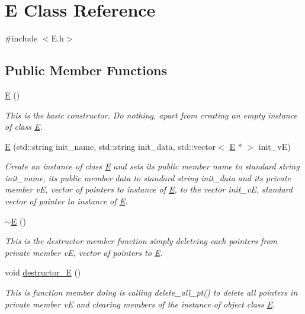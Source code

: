 \hypertarget{classE}{}\section{E Class Reference}
\label{classE}


{\ttfamily \#include $<$E.\+h$>$}

\subsection*{Public Member Functions}
\begin{DoxyCompactItemize}
\item 
\hyperlink{classE_ac26294d340a47c6a51c615c177052c91}{E} ()
\begin{DoxyCompactList}\small\item\em This is the basic constructor. Do nothing, apart from creating an empty instance of class \hyperlink{classE}{E}. \end{DoxyCompactList}\item 
\hyperlink{classE_aaef580a7f041f660ec68449300d516c8}{E} (std\+::string init\+\_\+name, std\+::string init\+\_\+data, std\+::vector$<$ \hyperlink{classE}{E} $\ast$ $>$ init\+\_\+vE)
\begin{DoxyCompactList}\small\item\em Create an instance of class \hyperlink{classE}{E} and sets its public member \textquotesingle{}name\textquotesingle{} to standard string init\+\_\+name, its public member \textquotesingle{}data\textquotesingle{} to standard string init\+\_\+data and its private member vE, vector of pointers to instance of \hyperlink{classE}{E}, to the vector init\+\_\+vE, standard vector of pointer to instance of \hyperlink{classE}{E}. \end{DoxyCompactList}\item 
\hyperlink{group__group__clear_ga7edcff371a18184dcc16cdf1523a001a}{$\sim$E} ()
\begin{DoxyCompactList}\small\item\em This is the destructor member function simply deleteing each pointers from private member vE, vector of pointers to \hyperlink{classE}{E}. \end{DoxyCompactList}\item 
void \hyperlink{group__group__clear_ga09718029acd816dd033853c94a1f8001}{destructor\+\_\+E} ()
\begin{DoxyCompactList}\small\item\em This is function member doing is calling delete\+\_\+all\+\_\+pt() to delete all pointers in private member vE and clearing members of the instance of object class \hyperlink{classE}{E}. \end{DoxyCompactList}\item 

\end{DoxyCompactItemize}
